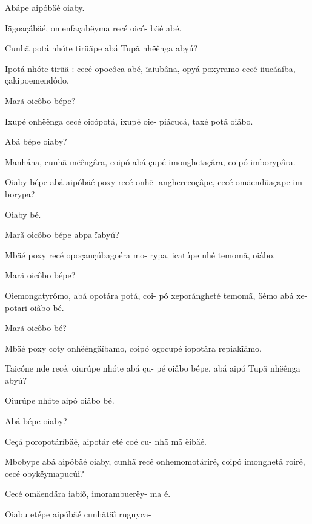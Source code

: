 \documentclass[openany,titlepage,12pt]{book}
\begin{document}
\begin{alternate}
    \item Abápe aipóbäé oiaby.
    \item Iägoaçábäé, omenfaçabëyma recé oicó-
        bäé abé.
    \item Cunhã potá nhóte tirüãpe abá Tupã\linebreak
        nhëênga abyú?
    \item Ipotá nhóte tirüã : cecé opocôca abé,\linebreak
        ïaiubâna, opyá poxyramo cecé iiucáäíba,
        çakipoemendôdo.
    \item Marã oicôbo bépe?
    \item Ixupé onhëênga cecé oicópotá, ixupé oie-
        piácucá, taxé potá oiâbo.
    \item Abá bépe oiaby?
    \item Manhána, cunhã mëêngâra, coipó abá
        çupé imonghetaçâra, coipó imborypâra.
    \item Oiaby bépe abá aipóbäé poxy recé onhë-
        angherecoçâpe, cecé omäendüaçape im-
        borypa?
    \item Oiaby bé.
    \item Marã oicôbo bépe abpa ïabyú?
    \item Mbäé poxy recé opoçauçúbagoéra mo-
        rypa, icatúpe nhé temomã, oiâbo.
    \item Marã oicôbo bépe?
    \item Oiemongatyrômo, abá opotára potá, coi-
        pó xeporángheté temomã, äémo abá xe-
        potari oiâbo bé.
    \item Marã oicôbo bé?
    \item Mbäé poxy coty onhëéngäíbamo, coipó
        ogocupé iopotâra repiak\~iämo.
    \item Taicóne nde recé, oiurúpe nhóte abá çu-
        pé oiâbo bépe, abá aipó Tupã nhëênga\linebreak
        abyú?
    \item Oiurúpe nhóte aipó oiâbo bé.
    \item Abá bépe oiaby?
    \item Ceçá poropotáríbäé, aipotár eté coé cu-
        nhã mã ëíbäé.
    \item Mbobype abá aipóbäé oiaby, cunhã recé
        onhemomotáriré, coipó imonghetá roiré,
        cecé obykëymapucúi?
    \item Cecé omäendära iabiõ, imorambuerëy-
        ma é.
    \item Oiabu etépe aipóbäé cunhãtä\~i ruguyca-

\end{alternate}
\end{document}
